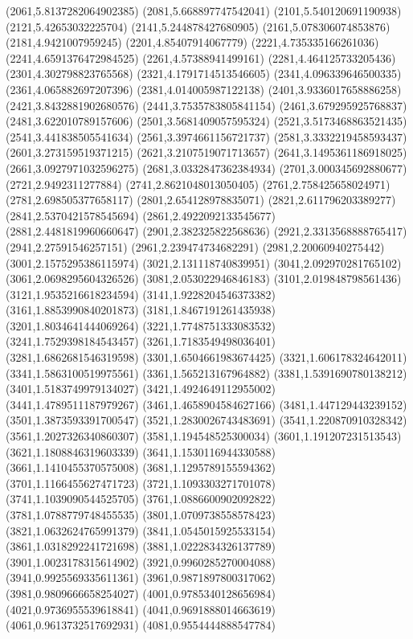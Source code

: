 {(2061,5.8137282064902385)
(2081,5.668897747542041)
(2101,5.540120691190938)
(2121,5.42653032225704)
(2141,5.244878427680905)
(2161,5.078306074853876)
(2181,4.9421007959245)
(2201,4.85407914067779)
(2221,4.735335166261036)
(2241,4.6591376472984525)
(2261,4.57388941499161)
(2281,4.464125733205436)
(2301,4.302798823765568)
(2321,4.1791714513546605)
(2341,4.096339646500335)
(2361,4.065882697207396)
(2381,4.014005987122138)
(2401,3.9336017658886258)
(2421,3.8432881902680576)
(2441,3.7535783805841154)
(2461,3.679295925768837)
(2481,3.622010789157606)
(2501,3.5681409057595324)
(2521,3.5173468863521435)
(2541,3.441838505541634)
(2561,3.3974661156721737)
(2581,3.3332219458593437)
(2601,3.273159519371215)
(2621,3.2107519071713657)
(2641,3.1495361186918025)
(2661,3.0927971032596275)
(2681,3.0332847362384934)
(2701,3.000345692880677)
(2721,2.9492311277884)
(2741,2.8621048013050405)
(2761,2.758425658024971)
(2781,2.698505377658117)
(2801,2.654128978835071)
(2821,2.611796203389277)
(2841,2.5370421578545694)
(2861,2.4922092133545677)
(2881,2.4481819960660647)
(2901,2.382325822568636)
(2921,2.3313568888765417)
(2941,2.27591546257151)
(2961,2.239474734682291)
(2981,2.20060940275442)
(3001,2.1575295386115974)
(3021,2.131118740839951)
(3041,2.092970281765102)
(3061,2.0698295604326526)
(3081,2.053022946846183)
(3101,2.019848798561436)
(3121,1.9535216618234594)
(3141,1.9228204546373382)
(3161,1.8853990840201873)
(3181,1.8467191261435938)
(3201,1.8034641444069264)
(3221,1.7748751333083532)
(3241,1.7529398184543457)
(3261,1.7183549498036401)
(3281,1.6862681546319598)
(3301,1.6504661983674425)
(3321,1.606178324642011)
(3341,1.5863100519975561)
(3361,1.565213167964882)
(3381,1.5391690780138212)
(3401,1.5183749979134027)
(3421,1.4924649112955002)
(3441,1.4789511187979267)
(3461,1.4658904584627166)
(3481,1.447129443239152)
(3501,1.3873593391700547)
(3521,1.2830026743483691)
(3541,1.220870910328342)
(3561,1.2027326340860307)
(3581,1.194548525300034)
(3601,1.191207231513543)
(3621,1.1808846319603339)
(3641,1.1530116944330588)
(3661,1.1410455370575008)
(3681,1.1295789155594362)
(3701,1.1166455627471723)
(3721,1.1093303271701078)
(3741,1.1039090544525705)
(3761,1.0886600902092822)
(3781,1.0788779748455535)
(3801,1.0709738558578423)
(3821,1.0632624765991379)
(3841,1.0545015925533154)
(3861,1.0318292241721698)
(3881,1.0222834326137789)
(3901,1.0023178315614902)
(3921,0.9960285270004088)
(3941,0.9925569335611361)
(3961,0.9871897800317062)
(3981,0.9809666658254027)
(4001,0.9785340128656984)
(4021,0.9736955539618841)
(4041,0.9691888014663619)
(4061,0.9613732517692931)
(4081,0.9554444888547784)
}
